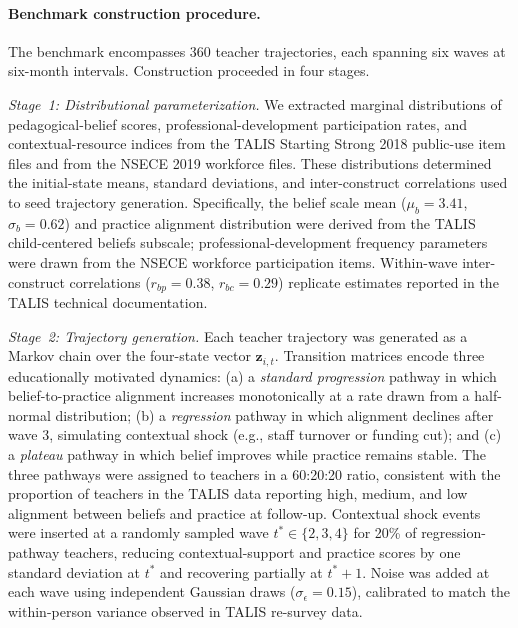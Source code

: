 \documentclass[pdflatex,sn-mathphys-num]{sn-jnl}%
\theoremstyle{thmstyleone}%
\theoremstyle{thmstyletwo}%
\theoremstyle{thmstylethree}%
\begin{document}
\paragraph{Benchmark construction procedure.}
\label{par:benchmark}

The benchmark encompasses 360 teacher trajectories, each spanning six waves at six-month intervals. Construction proceeded in four stages.

\textit{Stage~1: Distributional parameterization.} We extracted marginal distributions of pedagogical-belief scores, professional-development participation rates, and contextual-resource indices from the TALIS Starting Strong 2018 public-use item files and from the NSECE 2019 workforce files. These distributions determined the initial-state means, standard deviations, and inter-construct correlations used to seed trajectory generation. Specifically, the belief scale mean ($\mu_b = 3.41$, $\sigma_b = 0.62$) and practice alignment distribution were derived from the TALIS child-centered beliefs subscale; professional-development frequency parameters were drawn from the NSECE workforce participation items. Within-wave inter-construct correlations ($r_{bp} = 0.38$, $r_{bc} = 0.29$) replicate estimates reported in the TALIS technical documentation.

\textit{Stage~2: Trajectory generation.} Each teacher trajectory was generated as a Markov chain over the four-state vector $\mathbf{z}_{i,t}$. Transition matrices encode three educationally motivated dynamics: (a) a \emph{standard progression} pathway in which belief-to-practice alignment increases monotonically at a rate drawn from a half-normal distribution; (b) a \emph{regression} pathway in which alignment declines after wave 3, simulating contextual shock (e.g., staff turnover or funding cut); and (c) a \emph{plateau} pathway in which belief improves while practice remains stable. The three pathways were assigned to teachers in a 60:20:20 ratio, consistent with the proportion of teachers in the TALIS data reporting high, medium, and low alignment between beliefs and practice at follow-up. Contextual shock events were inserted at a randomly sampled wave $t^* \in \{2,3,4\}$ for 20\% of regression-pathway teachers, reducing contextual-support and practice scores by one standard deviation at $t^*$ and recovering partially at $t^*+1$. Noise was added at each wave using independent Gaussian draws ($\sigma_\epsilon = 0.15$), calibrated to match the within-person variance observed in TALIS re-survey data.
\end{document}

